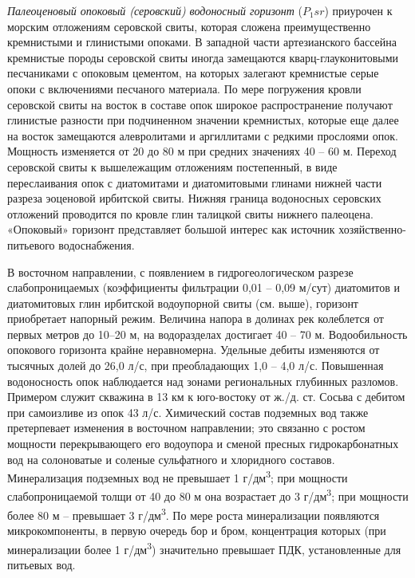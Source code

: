 \documentclass[a4paper,12pt]{article} %
\begin{document}
\textit{Палеоценовый опоковый (серовский) водоносный горизонт} ($P_1sr$) приурочен 
к морским отложениям серовской свиты, которая сложена преимущественно кремнистыми и 
глинистыми опоками. В западной части артезианского бассейна кремнистые породы серовской 
свиты иногда замещаются кварц-глауконитовыми песчаниками с опоковым цементом, на которых
залегают кремнистые серые опоки с включениями песчаного материала.
По мере погружения кровли серовской свиты на восток в составе опок широкое распространение получают глинистые разности при подчиненном значении кремнистых, которые еще далее на восток замещаются алевролитами и аргиллитами с редкими прослоями опок. Мощность изменяется от 20 до 80 м при средних значениях 40 – 60 м. Переход серовской свиты к вышележащим отложениям постепенный, в виде переслаивания опок с диатомитами и диатомитовыми глинами нижней части разреза эоценовой
ирбитской свиты. Нижняя граница водоносных серовских отложений проводится по кровле глин талицкой свиты нижнего палеоцена. «Опоковый» горизонт представляет большой интерес как источник хозяйственно-питьевого водоснабжения.

В восточном направлении, с появлением в гидрогеологическом разрезе слабопроницаемых (коэффициенты фильтрации 0,01 – 0,09 м/сут) диатомитов и диатомитовых глин ирбитской водоупорной свиты (см. выше), 
горизонт приобретает напорный режим. Величина напора в долинах рек колеблется от первых метров до 10–20 м, на водоразделах достигает 40 – 70 м. 
Водообильность опокового горизонта крайне неравномерна. Удельные дебиты изменяются от тысячных долей до 26,0 л/с, при преобладающих 1,0 – 4,0 л/с. Повышенная водоносность опок наблюдается над зонами региональных глубинных разломов. Примером служит скважина в 13 км к юго-востоку от ж./д. ст. Сосьва с дебитом при самоизливе из опок 43 л/с.
Химический состав подземных вод также претерпевает изменения в восточном направлении; это связанно с ростом мощности перекрывающего его водоупора и сменой пресных гидрокарбонатных вод на солоноватые и соленые сульфатного и хлоридного составов. Минерализация подземных вод не превышает 1 г/дм\textsuperscript{3}; при мощности слабопроницаемой толщи от 40 до 80 м она возрастает до 3 г/дм\textsuperscript{3}; при мощности более 80 м – превышает 3 г/дм\textsuperscript{3}. По мере роста минерализации появляются микрокомпоненты, в первую очередь бор и бром, концентрация которых (при минерализации более 1 г/дм\textsuperscript{3}) значительно превышает ПДК, установленные для питьевых вод.
\end{document}
